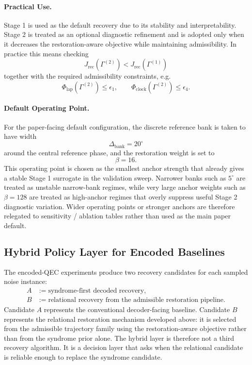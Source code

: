 \documentclass[11pt,a4paper]{article}
\theoremstyle{definition}
\theoremstyle{remark}
\begin{document}
\paragraph{Practical Use.}
Stage 1 is used as the default recovery due to its stability and interpretability. Stage 2 is treated as an optional diagnostic refinement and is adopted only when it decreases the restoration-aware objective while maintaining admissibility. In practice this means checking
\[
J_{\mathrm{rec}}(\Gamma^{(2)}) < J_{\mathrm{rec}}(\Gamma^{(1)})
\]
together with the required admissibility constraints, e.g.
\[
\Phi_{\mathrm{lap}}(\Gamma^{(2)}) \le \epsilon_1,
\qquad
\Phi_{\mathrm{clock}}(\Gamma^{(2)}) \le \epsilon_4.
\]

\paragraph{Default Operating Point.}
For the paper-facing default configuration, the discrete reference bank is taken to have width
\[
\Delta_{\mathrm{bank}} = 20^\circ
\]
around the central reference phase, and the restoration weight is set to
\[
\beta = 16.
\]
This operating point is chosen as the smallest anchor strength that already gives a stable Stage 1 surrogate in the validation sweep.  Narrower banks such as $5^\circ$ are treated as unstable narrow-bank regimes, while very large anchor weights such as $\beta = 128$ are treated as high-anchor regimes that overly suppress useful Stage 2 diagnostic variation.  Wider operating points or stronger anchors are therefore relegated to sensitivity / ablation tables rather than used as the main paper default.

\subsection{Hybrid Policy Layer for Encoded Baselines}

The encoded-QEC experiments produce two recovery candidates for each sampled
noise instance:
\begin{align*}
A &:= \text{syndrome-first decoded recovery},\\
B &:= \text{relational recovery from the admissible restoration pipeline}.
\end{align*}
Candidate $A$ represents the conventional decoder-facing baseline.  Candidate $B$
represents the relational restoration mechanism developed above: it is selected from
the admissible trajectory family using the restoration-aware objective rather than
from the syndrome prior alone.  The hybrid layer is therefore not a third recovery
algorithm.  It is a decision layer that asks when the relational candidate is reliable
enough to replace the syndrome candidate.
\end{document}
